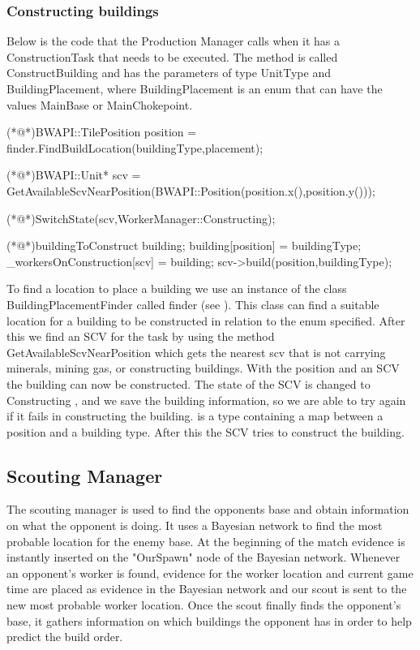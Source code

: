 		\subsubsection*{Constructing buildings}
			Below is the code that the Production Manager calls when it has a ConstructionTask that needs to be executed. The method is called 
			ConstructBuilding and has the parameters of type UnitType and BuildingPlacement, where BuildingPlacement 
			is an enum that can have the values MainBase or MainChokepoint.
			\begin{Sourcecode}[caption=ConstructBuilding method]		
	(*@\lnote@*)BWAPI::TilePosition position = finder.FindBuildLocation(buildingType,placement);

	(*@\lnote@*)BWAPI::Unit* scv = GetAvailableScvNearPosition(BWAPI::Position(position.x(),position.y()));
	

	(*@\lnote@*)SwitchState(scv,WorkerManager::Constructing);
	
	(*@\lnote@*)buildingToConstruct building;	
	building[position] = buildingType;
	_workersOnConstruction[scv] = building;
	scv->build(position,buildingType);
			\end{Sourcecode}
			
			To find a location to place a building we use an instance of the class BuildingPlacementFinder called finder (see ).
			This class can find a suitable location for a building to be constructed in relation to the enum specified. After this we find an SCV for the 
			task  by using the method GetAvailableScvNearPosition which gets the nearest scv that is not carrying minerals, mining gas, or 
			constructing buildings. With the position and an SCV the building can now be constructed. The state of the SCV is changed to Constructing , and 
			we save the building information, so we are able to try again if it fails in constructing the building.  is a type containing 
			a map between a position and a building type. After this the SCV tries to 
			construct the building.
	\subsection{Scouting Manager}
		The scouting manager is used to find the opponents base and obtain information on what the opponent is doing. 
		It uses a Bayesian network to find the most probable location for the enemy base.
		At the beginning of the match evidence is instantly inserted on the "OurSpawn" node of the Bayesian network.
		Whenever an opponent's worker is found, evidence for the worker location and current game time are placed as evidence in the 
		Bayesian network and our scout is sent to the new most probable worker location. 
		Once the scout finally finds the opponent's base, it gathers information on which 
		buildings the opponent has in order to help predict the build order.
